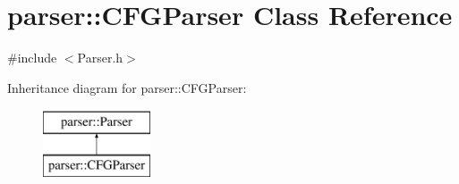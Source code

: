 \hypertarget{classparser_1_1CFGParser}{\section{parser\-:\-:\-C\-F\-G\-Parser \-Class \-Reference}
\label{de/d63/classparser_1_1CFGParser}
}


{\ttfamily \#include $<$\-Parser.\-h$>$}

\-Inheritance diagram for parser\-:\-:\-C\-F\-G\-Parser\-:\begin{figure}[H]
\begin{center}
\leavevmode
\includegraphics[height=2.000000cm]{de/d63/classparser_1_1CFGParser}
\end{center}
\end{figure}
